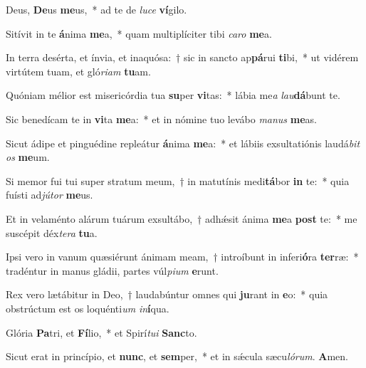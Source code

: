 \item Deus, \textbf{De}us \textbf{me}us,~* ad te de \textit{luce} \textbf{ví}gilo.

\item Sitívit in te \textbf{á}nima \textbf{me}a,~* quam multiplíciter tibi \textit{caro} \textbf{me}a.

\item In terra desérta, et ínvia, et inaquósa:~† sic in sancto ap\textbf{pá}rui \textbf{ti}bi,~* ut vidérem virtútem tuam, et gló\textit{riam} \textbf{tu}am.

\item Quóniam mélior est misericórdia tua \textbf{su}per \textbf{vi}tas:~* lábia me\textit{a} \textit{lau}\textbf{dá}bunt te.

\item Sic benedícam te in \textbf{vi}ta \textbf{me}a:~* et in nómine tuo levábo \textit{manus} \textbf{me}as.

\item Sicut ádipe et pinguédine repleátur \textbf{á}nima \textbf{me}a:~* et lábiis exsultatiónis laudá\textit{bit} \textit{os} \textbf{me}um.

\item Si memor fui tui super stratum meum,~† in matutínis medi\textbf{tá}bor \textbf{in} te:~* quia fuísti ad\textit{jútor} \textbf{me}us.

\item Et in velaménto alárum tuárum exsultábo,~† adhǽsit ánima \textbf{me}a \textbf{post} te:~* me suscépit déx\textit{tera} \textbf{tu}a.

\item Ipsi vero in vanum quæsiérunt ánimam meam,~† introíbunt in inferi\textbf{ó}ra \textbf{ter}ræ:~* tradéntur in manus gládii, partes vúl\textit{pium} \textbf{e}runt.

\item Rex vero lætábitur in Deo,~† laudabúntur omnes qui \textbf{ju}rant in \textbf{e}o:~* quia obstrúctum est os loquénti\textit{um} \textit{in}\textbf{í}qua.

\item Glória \textbf{Pa}tri, et \textbf{Fí}lio,~* et Spirí\textit{tui} \textbf{Sanc}to.

\item Sicut erat in princípio, et \textbf{nunc}, et \textbf{sem}per,~* et in sǽcula sæcu\textit{lórum}. \textbf{A}men.

